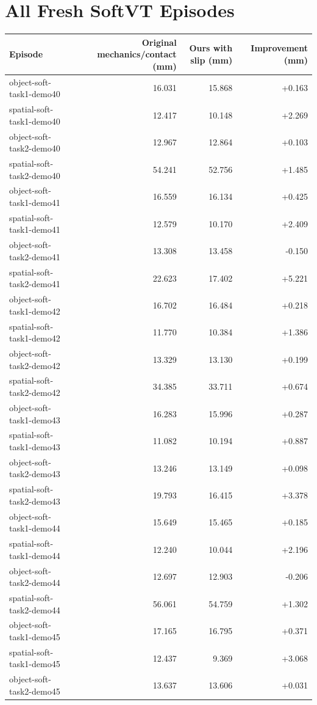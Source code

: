 \documentclass[10pt,twocolumn,letterpaper]{article}
\begin{document}
\clearpage
\onecolumn
\section{All Fresh SoftVT Episodes}
\begin{center}
\small
\begin{tabular}{lrrr}\toprule
Episode & Original mechanics/contact (mm) & Ours with slip (mm) & Improvement (mm)\\\midrule
object-soft-task1-demo40 & 16.031 & 15.868 & +0.163\\
spatial-soft-task1-demo40 & 12.417 & 10.148 & +2.269\\
object-soft-task2-demo40 & 12.967 & 12.864 & +0.103\\
spatial-soft-task2-demo40 & 54.241 & 52.756 & +1.485\\
object-soft-task1-demo41 & 16.559 & 16.134 & +0.425\\
spatial-soft-task1-demo41 & 12.579 & 10.170 & +2.409\\
object-soft-task2-demo41 & 13.308 & 13.458 & -0.150\\
spatial-soft-task2-demo41 & 22.623 & 17.402 & +5.221\\
object-soft-task1-demo42 & 16.702 & 16.484 & +0.218\\
spatial-soft-task1-demo42 & 11.770 & 10.384 & +1.386\\
object-soft-task2-demo42 & 13.329 & 13.130 & +0.199\\
spatial-soft-task2-demo42 & 34.385 & 33.711 & +0.674\\
object-soft-task1-demo43 & 16.283 & 15.996 & +0.287\\
spatial-soft-task1-demo43 & 11.082 & 10.194 & +0.887\\
object-soft-task2-demo43 & 13.246 & 13.149 & +0.098\\
spatial-soft-task2-demo43 & 19.793 & 16.415 & +3.378\\
object-soft-task1-demo44 & 15.649 & 15.465 & +0.185\\
spatial-soft-task1-demo44 & 12.240 & 10.044 & +2.196\\
object-soft-task2-demo44 & 12.697 & 12.903 & -0.206\\
spatial-soft-task2-demo44 & 56.061 & 54.759 & +1.302\\
object-soft-task1-demo45 & 17.165 & 16.795 & +0.371\\
spatial-soft-task1-demo45 & 12.437 & 9.369 & +3.068\\
object-soft-task2-demo45 & 13.637 & 13.606 & +0.031\\

\end{tabular}
\end{center}
\end{document}
